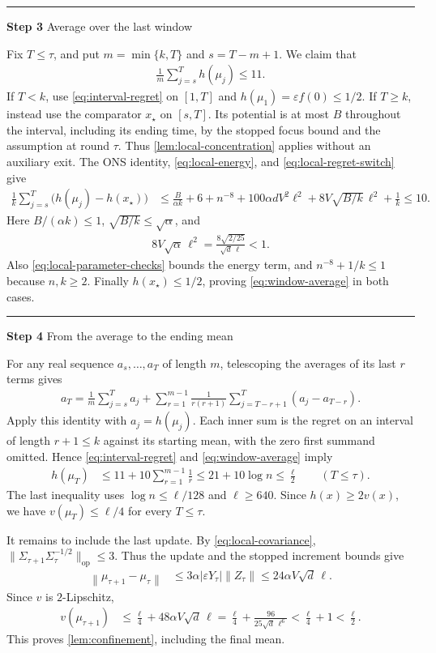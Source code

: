 \documentclass[11pt]{article}
\newcommand{\proofstep}[2]{%
    \par\medskip
    \noindent
    \textcolor{blue!55!black}{\rule{2pt}{1.2em}}%
    \hspace{0.6em}%
    {\sffamily\bfseries\color{blue!55!black}Step #1}%
    \quad
    {\sffamily #2}%
    \par\smallskip
}
\newcommand{\op}{\mathrm{op}}
\newcommand{\1}{\mathbf 1}
\newcommand{\eps}{\varepsilon}
\newcommand{\norm}[1]{\left\lVert #1\right\rVert}
\begin{document}
\proofstep{3}{Average over the last window}
Fix $T\leq\tau$, and put $m=\min\{k,T\}$ and $s=T-m+1$. We claim that
\begin{align}
    \frac1m\sum_{j=s}^T h(\mu_j)\leq11.
    \label{eq:window-average}
\end{align}
If $T<k$, use \eqref{eq:interval-regret} on $[1,T]$ and
$h(\mu_1)=\eps f(0)\leq1/2$.
If $T\geq k$, instead use the comparator $x_\star$ on $[s,T]$.
Its potential is at most $B$ throughout the interval, including its
ending time, by the stopped focus bound and the assumption at round
$\tau$. Thus \cref{lem:local-concentration} applies without an auxiliary
exit. The ONS identity, \eqref{eq:local-energy}, and
\eqref{eq:local-regret-switch} give
\begin{align}
    \frac1k\sum_{j=s}^T\bigl(h(\mu_j)-h(x_\star)\bigr)
     & \leq\frac{B}{\alpha k}+6+n^{-8}
    +100\alpha dV^2\ell^2
    +8V\sqrt{B/k}\,\ell^2+\frac1k
    \leq10.
\end{align}
Here $B/(\alpha k)\leq1$, $\sqrt{B/k}\leq\sqrt\alpha$, and
\begin{align}
    8V\sqrt\alpha\,\ell^2
    =\frac{8\sqrt{2/25}}{\sqrt d\,\ell}<1.
\end{align}
Also \eqref{eq:local-parameter-checks} bounds the energy term, and
$n^{-8}+1/k\leq1$ because $n,k\geq2$.
Finally $h(x_\star)\leq1/2$, proving \eqref{eq:window-average} in both
cases.

\proofstep{4}{From the average to the ending mean}
For any real sequence $a_s,\ldots,a_T$ of length $m$, telescoping the
averages of its last $r$ terms gives
\begin{align}
    a_T
    =\frac1m\sum_{j=s}^T a_j
    +\sum_{r=1}^{m-1}\frac1{r(r+1)}
    \sum_{j=T-r+1}^T(a_j-a_{T-r}).
    \label{eq:suffix-average-identity}
\end{align}
Apply this identity with $a_j=h(\mu_j)$. Each inner sum is the regret on
an interval of length $r+1\leq k$ against its starting mean, with the
zero first summand omitted. Hence \eqref{eq:interval-regret} and
\eqref{eq:window-average} imply
\begin{align}
    h(\mu_T)
     & \leq11+10\sum_{r=1}^{m-1}\frac1r
    \leq21+10\log n
    \leq\frac\ell2
    \qquad(T\leq\tau).
    \label{eq:last-iterate-extension}
\end{align}
The last inequality uses $\log n\leq\ell/128$ and $\ell\geq640$.
Since $h(x)\geq2v(x)$, we have $v(\mu_T)\leq\ell/4$ for every
$T\leq\tau$.

It remains to include the last update. By \eqref{eq:local-covariance},
$\|\Sigma_{\tau+1}\Sigma_\tau^{-1/2}\|_{\op}\leq3$.
Thus the update and the stopped increment bounds give
\begin{align}
    \norm{\mu_{\tau+1}-\mu_\tau}
     & \leq3\alpha|\eps Y_\tau|\norm{Z_\tau}
    \leq24\alpha V\sqrt d\,\ell.
\end{align}
Since $v$ is $2$-Lipschitz,
\begin{align}
    v(\mu_{\tau+1})
     & \leq\frac\ell4+48\alpha V\sqrt d\,\ell
    =\frac\ell4+\frac{96}{25\sqrt d\,\ell^6}
    <\frac\ell4+1<\frac\ell2.
\end{align}
This proves \cref{lem:confinement}, including the final mean.
\end{document}
